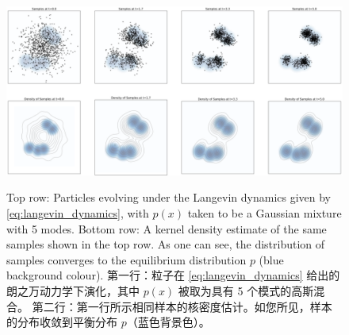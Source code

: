 \begin{figure}[!t]
    \centering
    \includegraphics[width=\textwidth]{figures/langevin.png}
    \label{fig:langevin}
    \caption{
        Top row: Particles evolving under the Langevin dynamics given by \cref{eq:langevin_dynamics}, with $p(x)$ taken to be a Gaussian mixture with 5 modes. 
        Bottom row: A kernel density estimate of the same samples shown in the top row. 
        As one can see, the distribution of samples converges to the equilibrium distribution $p$ (blue background colour).
        第一行：粒子在 \cref{eq:langevin_dynamics} 给出的朗之万动力学下演化，其中 $p(x)$ 被取为具有 5 个模式的高斯混合。
        第二行：第一行所示相同样本的核密度估计。如您所见，样本的分布收敛到平衡分布 $p$（蓝色背景色）。
    } 
\end{figure}
